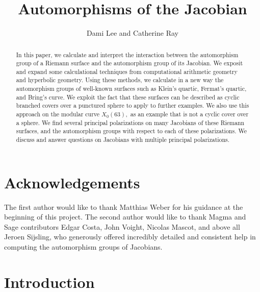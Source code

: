 \documentclass[12pt,reqno]{amsart}
\title{Automorphisms of the Jacobian}
\author{Dami Lee and Catherine Ray}
\theoremstyle{definition}
\theoremstyle{remark}
\begin{document}
	
	\maketitle
	
\begin{abstract}
In this paper, we calculate and interpret the interaction between the automorphism group of a Riemann surface and the automorphism group of its Jacobian. We exposit and expand some calculational techniques from computational arithmetic geometry and hyperbolic geometry. Using these methods, we calculate in a new way the automorphism groups of well-known surfaces such as Klein's quartic, Fermat's quartic, and Bring's curve. We exploit the fact that these surfaces can be described as cyclic branched covers over a punctured sphere to apply to further examples. We also use this approach on the modular curve $X_0(63),$ as an example that is not a cyclic cover over a sphere. We find several principal polarizations on many Jacobians of these Riemann surfaces, and the automorphism groups with respect to each of these polarizations. We discuss and answer questions on Jacobians with multiple principal polarizations. 
\end{abstract} 
	
	
\tableofcontents




\section*{Acknowledgements} 
The first author would like to thank Matthias Weber for his guidance at the beginning of this project. The second author would like to thank Magma and Sage contributors Edgar Costa, John Voight, Nicolas Mascot, and above all Jeroen Sijsling, who generously offered incredibly detailed and consistent help in computing the automorphism groups of Jacobians.

\section{Introduction} 

\end{document}
